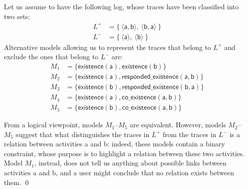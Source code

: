 \begin{example}
\label{ex:unaryVsBinary}
Let us assume %
 to have the following log, whose traces have been classified into two sets:
%
\begin{align*}
L^+ & = \{\ \langle \mathsf{a}, \mathsf{b}\rangle,\ \langle \mathsf{b}, \mathsf{a} \rangle \ \} \\
L^- & = \{\ \langle \mathsf{a}\rangle,\ \langle \mathsf{b} \rangle \ \}
\end{align*}
%
Alternative models allowing us to represent the traces that belong to $L^+$ %
and exclude the ones that belong to $L^-$ %
are:%
\begin{align*}
M_1 & = \{ \mathsf{existence(a),existence(b)}\} \\
M_2 & = \{ \mathsf{existence(a), responded\_existence(a, b)}\} \\
M_3 & = \{ \mathsf{existence(b), responded\_existence(b, a)}\} \\
M_4 & = \{ \mathsf{existence(a), co\_existence(a, b)}\} \\
M_5 & = \{ \mathsf{existence(b), co\_existence(a, b)}\}
\end{align*}
%

From a %
 logical viewpoint, models $M_1$--$M_5$ %
 are equivalent. However, models  $M_2$--$M_5$ %
 suggest that what distinguishes the traces in $L^+$ from the traces in $L^-$  
 is a relation between activities \textsf{a} and \textsf{b}: indeed, these models contain a binary constraint, whose purpose is to highlight a relation between these two activities. %
 Model $M_1$, %
 instead, does not tell us anything about possible links between activities \textsf{a} and \textsf{b}, and a user might conclude that no relation exists between them.%
\qed
\end{example}

